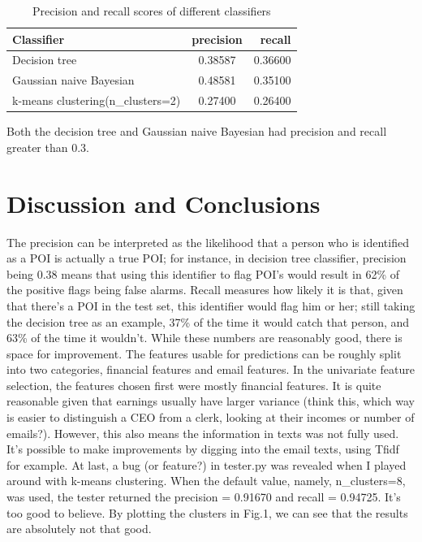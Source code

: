 \documentclass[12pt]{article}
\begin{document}
\begin{table}[h]
\caption{Precision and recall scores of different classifiers}
\centering
\begin{tabular}{lcr}
\toprule
Classifier & precision & recall \\
\midrule
Decision tree & 0.38587 & 0.36600 \\
Gaussian naive Bayesian & 0.48581 & 0.35100 \\
k-means clustering(n\_clusters=2) & 0.27400 & 0.26400 \\
\bottomrule
\end{tabular}
\end{table}

Both the decision tree and Gaussian naive Bayesian had precision and recall greater than 0.3.
\section{Discussion and Conclusions}
The precision can be interpreted as the likelihood that a person who is identified as a POI is actually a true POI; for instance, in decision tree classifier, precision being 0.38 means that using this identifier to flag POI's would result in 62\% of the positive flags being false alarms.  Recall measures how likely it is that, given that there's a POI in the test set, this identifier would flag him or her; still taking the decision tree as an example, 37\% of the time it would catch that person, and 63\% of the time it wouldn't.
While these numbers are reasonably good, there is space for improvement. The features usable for predictions can be roughly split into two categories, financial features and email features. In the univariate feature selection, the features chosen first were mostly financial features. It is quite reasonable given that earnings usually have larger variance (think this, which way is easier to distinguish a CEO from a clerk, looking at their incomes or number of emails?). However, this also means the information in texts was not fully used. It's possible to make improvements by digging into the email texts, using Tfidf for example.
At last, a bug (or feature?) in tester.py was revealed when I played around with k-means clustering. When the default value, namely, n\_clusters=8, was used, the tester returned the precision = 0.91670  and recall = 0.94725. It's too good to believe. By plotting the clusters in Fig.1, we can see that the results are absolutely not that good.
\end{document}
